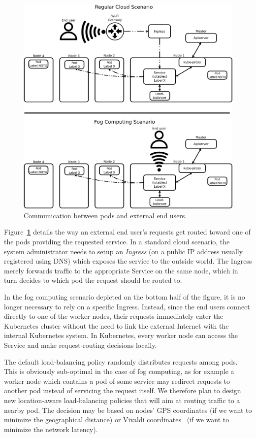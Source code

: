 \documentclass[letterpaper,twocolumn,10pt]{article}
\let\origref\ref
\def\ref#1{\textbf{\origref{#1}}}
\begin{document}
\begin{figure}[tbp]
  \centering
  \includegraphics[width=\linewidth]{images/ing.png}
  \caption{Communication between pods and external end users.}
  \label{fig:ing}
\end{figure}

Figure~\ref{fig:ing} details the way an external end user's requests
get routed toward one of the pods providing the requested service. In
a standard cloud scenario, the system administrator needs to setup an
\emph{Ingress} (on a public IP address usually registered using DNS)
which exposes the service to the outside world. The Ingress merely
forwards traffic to the appropriate Service on the same node, which in
turn decides to which pod the request should be routed to.

In the fog computing scenario depicted on the bottom half of the
figure, it is no longer necessary to rely on a specific
Ingress. Instead, since the end users connect directly to one of the
worker nodes, their requests immediately enter the Kubernetes cluster
without the need to link the external Internet with the internal
Kubernetes system. In Kubernetes, every worker node can access the
Service and make request-routing decisions locally.

The default load-balancing policy randomly distributes requests among
pods. This is obviously sub-optimal in the case of fog computing, as
for example a worker node which contains a pod of some service may
redirect requests to another pod instead of servicing the request
itself. We therefore plan to design new location-aware load-balancing
policies that will aim at routing traffic to a nearby pod. The
decision may be based on nodes' GPS coordinates (if we want to
minimize the geographical distance) or Vivaldi
coordinates~\cite{vivaldi} (if we want to minimize the network
latency).
\end{document}
